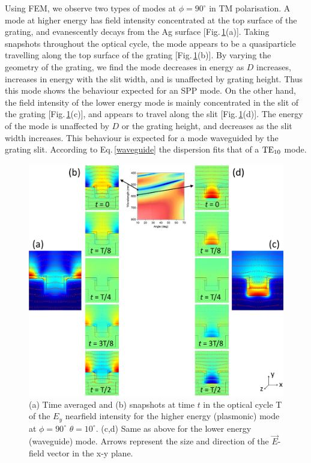 Using FEM, we observe two types of modes at $\phi=90^{\circ}$ in TM polarisation. A mode at higher energy has field intensity concentrated at the top surface of the grating, and evanescently decays from the Ag surface [Fig.\,\ref{7Fig12}(a)]. Taking snapshots throughout the optical cycle, the mode appears to be a quasiparticle travelling along the top surface of the grating [Fig.\,\ref{7Fig12}(b)]. By varying the geometry of the grating, we find the mode decreases in energy as $D$ increases, increases in energy with the slit width, and is unaffected by grating height. Thus this mode shows the behaviour expected for an SPP mode. On the other hand, the field intensity of the lower energy mode is mainly concentrated in the slit of the grating [Fig.\,\ref{7Fig12}(c)], and appears to travel along the slit [Fig.\,\ref{7Fig12}(d)]. The energy of the mode is unaffected by $D$ or the grating height, and decreases as the slit width increases. This behaviour is expected for a mode waveguided by the grating slit. According to Eq.\,\ref{waveguide} the dispersion fits that of a $\textnormal{TE}_{10}$ mode. 
\begin{figure}[h!p] 
\centering    
\includegraphics[width=\textwidth]{Fig12}
\caption{(a) Time averaged and (b) snapshots at time $t$ in the optical cycle T of the $E_y$ nearfield intensity for the higher energy (plasmonic) mode at $\phi=90^{\circ}$ $\theta=10^{\circ}$. (c,d) Same as above for the lower energy (waveguide) mode. Arrows represent the size and direction of the $\vec{E}$-field vector in the x-y plane. }
\label{7Fig12}
\end{figure}

